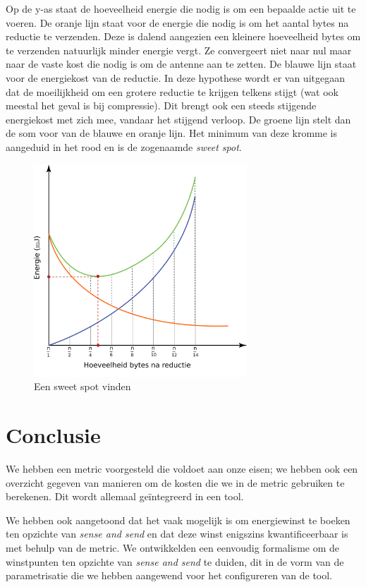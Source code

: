 \documentclass[11pt]{article}
\begin{document}
Op de y-as staat de hoeveelheid energie die nodig is om een bepaalde actie uit te voeren.
De oranje lijn staat voor de energie die nodig is om het aantal bytes na reductie te verzenden. Deze is dalend aangezien een kleinere hoeveelheid bytes om te verzenden natuurlijk minder energie vergt. Ze convergeert niet naar nul maar naar de vaste kost die nodig is om de antenne aan te zetten.
De blauwe lijn staat voor de energiekost van de reductie. In deze hypothese wordt er van uitgegaan dat de moeilijkheid om een grotere reductie te krijgen telkens stijgt (wat ook meestal het geval is bij compressie). Dit brengt ook een steeds stijgende energiekost met zich mee, vandaar het stijgend verloop.
De groene lijn stelt dan de som voor van de blauwe en oranje lijn. Het minimum van deze kromme is aangeduid in het rood en is de zogenaamde \textit{sweet spot}. 
\begin{figure}[H]
\centering
\includegraphics[width=8cm]{sweetspot}
\caption{Een sweet spot vinden}
\label{fig:sweet_spot}
\end{figure}
\section{Conclusie}

We hebben een metric voorgesteld die voldoet aan onze eisen; we hebben ook een
overzicht gegeven van manieren om de kosten die we in de metric gebruiken te
berekenen. Dit wordt allemaal ge\"integreerd in een tool.

We hebben ook aangetoond dat het vaak mogelijk is om energiewinst te boeken ten
opzichte van \textit{sense and send} en dat deze winst enigszins
kwantificeerbaar is met behulp van de metric. We ontwikkelden een eenvoudig
formalisme om de winstpunten ten opzichte van \textit{sense and send} te duiden,
dit in de vorm van de parametrisatie die we hebben aangewend voor het
configureren van de tool.
\end{document}
